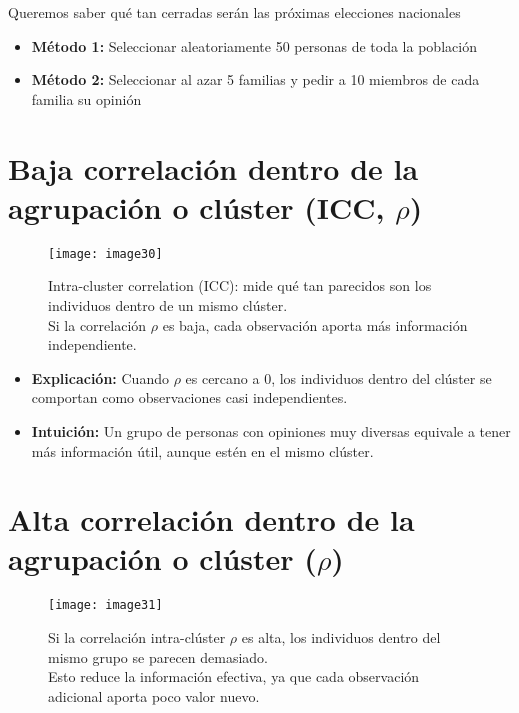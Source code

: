 \documentclass[12pt]{article}
\begin{document}
Queremos saber qué tan cerradas serán las próximas elecciones nacionales

\begin{itemize}
    \item \textbf{Método 1:} Seleccionar aleatoriamente 50 personas de toda la población
    \item \textbf{Método 2:} Seleccionar al azar 5 familias y pedir a 10 miembros de cada familia su opinión
\end{itemize}

\section*{\noindent\textbf{Baja correlación dentro de la agrupación o clúster (ICC, $\rho$)}}

\begin{figure}[h]
    \centering
    \texttt{[image: image30]}
    \caption*{\footnotesize Intra-cluster correlation (ICC): mide qué tan parecidos son los individuos dentro de un mismo clúster. 
    \\[3pt] 
    Si la correlación $\rho$ es baja, cada observación aporta más información independiente.}
\end{figure}

\begin{itemize}
    \item \textbf{Explicación:} Cuando $\rho$ es cercano a 0, los individuos dentro del clúster se comportan como observaciones casi independientes.
    \item \textbf{Intuición:} Un grupo de personas con opiniones muy diversas equivale a tener más información útil, aunque estén en el mismo clúster.
\end{itemize}

\section*{\noindent\textbf{Alta correlación dentro de la agrupación o clúster ($\rho$)}}

\begin{figure}[h]
    \centering
    \texttt{[image: image31]}
    \caption*{\footnotesize Si la correlación intra-clúster $\rho$ es alta, los individuos dentro del mismo grupo se parecen demasiado. 
    \\[3pt] Esto reduce la información efectiva, ya que cada observación adicional aporta poco valor nuevo.}
\end{figure}
\end{document}
